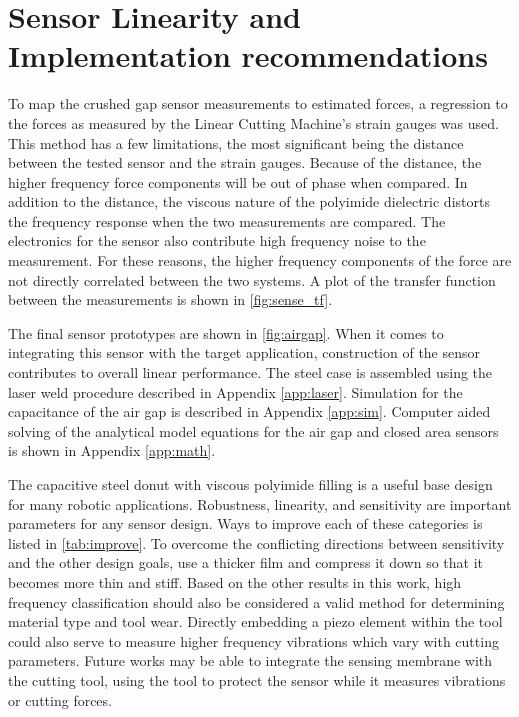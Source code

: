 \chapter{Sensor Linearity and Implementation recommendations
\label{chap:10}}

To map the crushed gap sensor measurements to estimated forces, 
a regression to the forces as measured by the 
Linear Cutting Machine's strain gauges was used.
This method has a few limitations, the most significant
being the distance between the tested sensor and the strain gauges.
Because of the distance, the higher frequency force components will
be out of phase when compared. 
In addition to the distance, the viscous nature of the polyimide dielectric distorts the 
frequency response when the two measurements are compared.
The electronics for the sensor also contribute high frequency noise to the measurement.
For these reasons, the higher frequency components of the force are not directly correlated 
between the two systems. 
A plot of the transfer function between the measurements is shown in \ref{fig:sense_tf}.

The final sensor prototypes are shown in \ref{fig:airgap}.
When it comes to integrating this sensor with the target application,
construction of the sensor contributes to overall linear performance.
The steel case is assembled using the laser weld procedure described in Appendix \ref{app:laser}.
Simulation for the capacitance of the air gap is described in Appendix \ref{app:sim}.
Computer aided solving of the analytical model equations for the air gap and closed area sensors
is shown in Appendix \ref{app:math}.

The capacitive steel donut with viscous polyimide filling is a useful base design
for many robotic applications. Robustness, linearity, and sensitivity are important 
parameters for any sensor design. Ways to improve each of these categories is listed in \ref{tab:improve}.
To overcome the conflicting directions between sensitivity and the other design goals,
 use a thicker film and compress it down so that it becomes more thin and stiff.
Based on the other results in this work, high frequency classification 
should also be considered a valid method for
 determining material type and tool wear. 
Directly embedding a piezo element within the tool could
also serve to measure higher frequency vibrations which vary with cutting parameters.
Future works may be able to integrate the sensing membrane with the cutting tool,
using the tool to protect the sensor while it measures vibrations or cutting forces.


